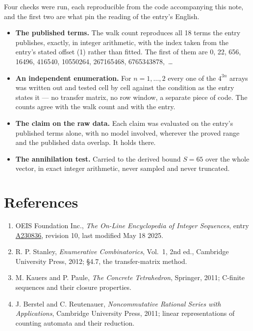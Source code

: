 \documentclass[11pt]{article}
\theoremstyle{definition}
\begin{document}
Four checks were run, each reproducible from the code accompanying this note, and the first two are what pin the reading of the entry's English.

\begin{itemize}

\item {\bfseries The published terms.} The walk count reproduces all 18 terms the entry publishes, exactly, in integer arithmetic, with the index taken from the entry's stated offset (1) rather than fitted. The first of them are 0, 22, 656, 16496, 416540, 10550264, 267165468, 6765343878,~\dots

\item {\bfseries An independent enumeration.} For $n = 1,\dots,2$ every one of the $4^{3n}$ arrays was written out and tested cell by cell against the condition as the entry states it --- no transfer matrix, no row window, a separate piece of code. The counts agree with the walk count and with the entry.

\item {\bfseries The claim on the raw data.} Each claim was evaluated on the entry's published terms alone, with no model involved, wherever the proved range and the published data overlap. It holds there.

\item {\bfseries The annihilation test.} Carried to the derived bound $S = 65$ over the whole vector, in exact integer arithmetic, never sampled and never truncated.

\end{itemize}

\section{References}

\begin{enumerate}

\item OEIS Foundation Inc., \emph{The On-Line Encyclopedia of Integer Sequences}, entry \href{https://oeis.org/A230836}{A230836}, revision 10, last modified May 18 2025.

\item R. P. Stanley, \emph{Enumerative Combinatorics}, Vol.~1, 2nd ed., Cambridge University Press, 2012; \S4.7, the transfer-matrix method.

\item M. Kauers and P. Paule, \emph{The Concrete Tetrahedron}, Springer, 2011; C-finite sequences and their closure properties.

\item J. Berstel and C. Reutenauer, \emph{Noncommutative Rational Series with Applications}, Cambridge University Press, 2011; linear representations of counting automata and their reduction.

\end{enumerate}
\end{document}
